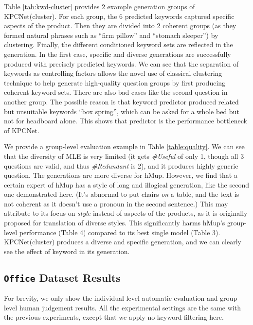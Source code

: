 Table \ref{tab:kwd-cluster} provides 2 example generation groups of KPCNet(cluster). For each group, the 6 predicted keywords captured specific aspects of the product. Then they are divided into 2 coherent groups (as they formed natural phrases such as ``firm pillow'' and ``stomach sleeper'') by clustering. Finally, the different conditioned keyword sets are reflected in the generation. In the first case, specific and diverse generations are successfully produced with precisely predicted keywords. We can see that the separation of keywords as controlling factors allows the novel use of classical clustering technique to help generate high-quality question groups by first producing coherent keyword sets. There are also bad cases like the second question in another group. The possible reason is that keyword predictor produced related but unsuitable keywords ``box spring'', which can be asked for a whole bed but not for headboard alone. This shows that predictor is the performance bottleneck of KPCNet.


We provide a group-level evaluation example in Table \ref{table:quality}. We can see that the diversity of MLE is very limited (it gets \textit{\#Useful} of only 1, though all 3 questions are valid, and thus \textit{\#Redundant} is 2), and it produces highly generic question. The generations are more diverse for hMup. However, we find that a certain expert of hMup has a style of long and illogical generation, like the second one demonstrated here. (It's abnormal to put chairs \textit{on} a table, and the text is not coherent as it doesn't use a pronoun in the second sentence.) This may attribute to its focus on \textit{style} instead of aspects of the products, as it is originally proposed for translation of diverse styles. This significantly harms hMup's group-level performance (Table 4) compared to its best single model (Table 3). KPCNet(cluster) produces a diverse and specific generation, and we can clearly see the effect of keyword in its generation. 

\subsection{\texttt{Office} Dataset Results}

For brevity, we only show the individual-level automatic evaluation and group-level human judgement results. All the experimental settings are the same with the previous experiments, except that we apply no keyword filtering here. 

